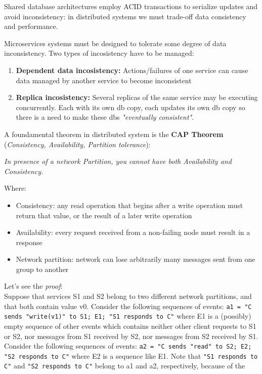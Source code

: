 \documentclass[10pt,a4paper]{report}
\begin{document}
Shared database architectures employ ACID transactions to serialize updates and avoid inconsistency: in distributed systems we must trade-off data consistency and performance.

Microservices systems must be designed to tolerate some degree of data inconsistency. Two types of incosistency have to be managed:
\begin{enumerate}
	\item \textbf{Dependent data incosistency:} Actions/failures of one service can cause data managed by another service to become
	inconsistent
	
	\item \textbf{Replica incosistency:} Several replicas of the same service may be executing concurrently. Each with its own db copy, each updates its own db copy so there is a need to make these dbs \textit{"eventually consistent"}.
\end{enumerate}
A foundamental theorem in distributed system is the \textbf{CAP Theorem} (\textit{Consistency, Availability, Partition tolerance}):
\begin{center}
	\textit{In presence of a network Partition, you cannot have both Availability and Consistency.}
\end{center}
Where:
\begin{itemize}
	\item Consistency: any read operation that begins after a write operation must return that value, or the
	result of a later write operation
	\item Availability: every request received from a non-failing node must result in a response
	\item Network partition: network can lose arbitrarily many messages sent from one group to another
\end{itemize}
Let's see the \textit{proof}:\\
Suppose that services S1 and S2 belong to two different network partitions, and that both contain value v0.
Consider the following sequences of events: \texttt{a1 = "C sends "write(v1)" to S1; E1; "S1 responds to C"}
where E1 is a (possibly) empty sequence of other events which contains neither other client requests to S1 or
S2, nor messages from S1 received by S2, nor messages from S2 received by S1.\\
Consider the following sequences of events: \texttt{a2 = "C sends "read" to S2; E2; "S2 responds to C"}
where E2 is a sequence like E1.
Note that \texttt{"S1 responds to C"} and \texttt{"S2 responds to C"} belong to a1 and a2, respectively, because of the
\end{document}
